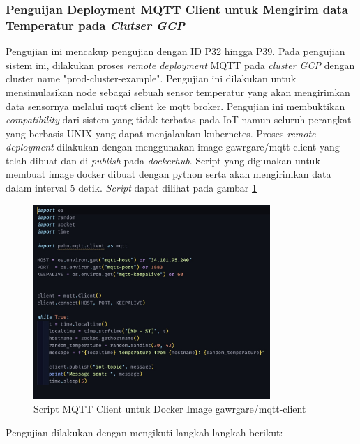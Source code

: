 \subsubsection{Penguijan Deployment MQTT Client untuk Mengirim data Temperatur pada \textit{Clutser GCP}}

Pengujian ini mencakup pengujian dengan ID P32 hingga P39. Pada pengujian sistem ini, dilakukan proses \textit{remote deployment} MQTT pada \textit{cluster GCP} dengan cluster name "prod-cluster-example". Pengujian ini dilakukan untuk mensimulasikan node sebagai sebuah sensor temperatur yang akan mengirimkan data sensornya melalui mqtt client ke mqtt broker. Pengujian ini membuktikan  \textit{compatibility} dari sistem yang tidak terbatas pada IoT namun seluruh perangkat yang berbasis UNIX yang dapat menjalankan kubernetes. Proses \textit{remote deployment} dilakukan dengan menggunakan image gawrgare/mqtt-client yang telah dibuat dan di \textit{publish} pada \textit{dockerhub}. Script yang digunakan untuk membuat image docker dibuat dengan python serta akan mengirimkan data dalam interval 5 detik. \textit{Script} dapat dilihat pada gambar \ref{fig:pengujian-gcp-script-docker-images}

\begin{figure}[htbp]
    \centering
    \includegraphics[width=0.8\textwidth]{resources/chapter-4/pengujian/pengujian-gcp-docker-image.jpg}
    \caption{Script MQTT Client untuk Docker Image gawrgare/mqtt-client}
    \label{fig:pengujian-gcp-script-docker-images}
\end{figure}

Pengujian dilakukan dengan mengikuti langkah langkah berikut:

